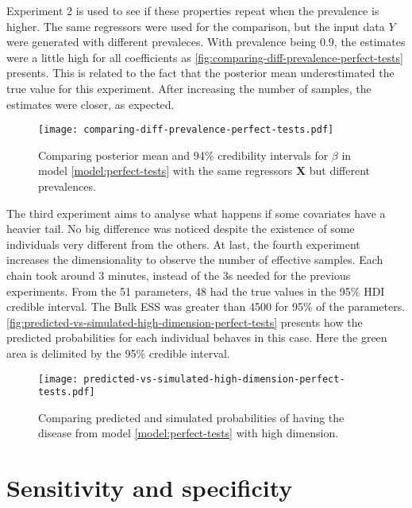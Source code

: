 Experiment 2 is used to see if these properties repeat when the prevalence is
higher. The same regressors were used for the comparison, but the input data
$Y$ were generated with different prevaleces. With prevalence being 0.9, the
estimates were a little high for all coefficients as
\autoref{fig:comparing-diff-prevalence-perfect-tests} presents. This is
related to the fact that the posterior mean underestimated the true value for this
experiment. After increasing the number of samples, the estimates were closer,
as expected. 

\begin{figure}[!ht]
  \centering  
  \caption{\label{fig:comparing-diff-prevalence-perfect-tests}Comparing
  posterior mean and 94\% credibility intervals for $\beta$ in model \eqref{model:perfect-tests} with the same regressors
  $\boldsymbol{X}$ but different prevalences.}
  \texttt{[image: comparing-diff-prevalence-perfect-tests.pdf]}
\end{figure} 

The third experiment aims to analyse what happens if some covariates have a
heavier tail. No big difference was noticed despite the existence of some
individuals very different from the others. At last, the fourth experiment
increases the dimensionality to observe the number of effective samples. Each
chain took around 3 minutes, instead of the 3s needed for the previous
experiments. From the 51 parameters, 48 had the true values in the 95\% HDI
credible interval. The Bulk ESS was greater than 4500 for 95\% of the
parameters. \autoref{fig:predicted-vs-simulated-high-dimension-perfect-tests}
presents how the predicted probabilities for each individual behaves in this
case. Here the green area is delimited by the 95\% credible interval. 

\begin{figure}[!hb]
  \centering  
  \caption{\label{fig:predicted-vs-simulated-high-dimension-perfect-tests}
  Comparing predicted and simulated probabilities of having the disease from
  model \eqref{model:perfect-tests} with high dimension.}
  \texttt{[image: predicted-vs-simulated-high-dimension-perfect-tests.pdf]}
\end{figure} 

\section{Sensitivity and specificity}

